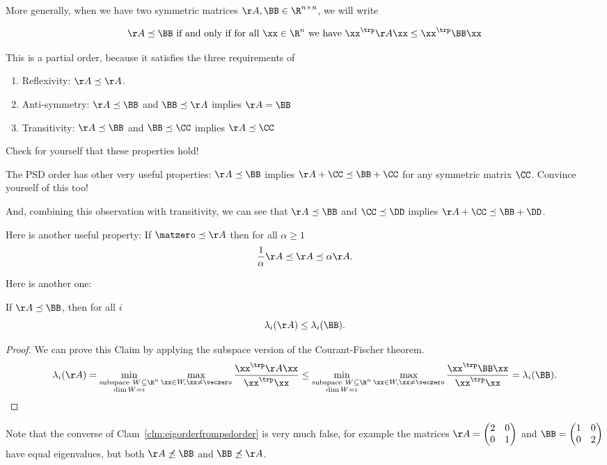 More generally, when we have two symmetric matrices $\AA, \BB \in
\R^{n \times n}$, we will write

\begin{equation}
  \label{eq:psdorder}
  \AA \preceq \BB
  \text{ if and only if for all } \xx \in \R^n
  \text{ we have } \xx^{\trp} \AA \xx \leq \xx^{\trp} \BB
  \xx
\end{equation}

This is a partial order, because it satisfies the three requirements
of
\begin{enumerate}
\item Reflexivity: $\AA \preceq \AA$.
\item Anti-symmetry:
  $\AA \preceq \BB$ and $\BB \preceq \AA$
  implies $\AA = \BB$
\item Transitivity:    $\AA \preceq \BB$ and $\BB \preceq \CC$
  implies $\AA \preceq \CC$
\end{enumerate}
Check for yourself that these properties hold!

The PSD order has other very useful properties:
$\AA \preceq \BB$ implies $\AA + \CC \preceq \BB + \CC$ for any
symmetric matrix $\CC$. Convince yourself of this too!

And, combining this observation with transitivity, we can see that
$\AA \preceq \BB$  and $\CC\preceq \DD$
implies ${\AA + \CC \preceq \BB + \DD}$.

Here is another useful property: If $\matzero \preceq \AA$ then for all $\alpha \geq 1$
\[
 \frac{1}{\alpha} \AA \preceq \AA \preceq \alpha \AA.
\]

Here is another one:
\begin{claim}
  \label{clm:eigorderfrompsdorder}
If $\AA \preceq \BB$, then for all $i$
\[
\lambda_i(\AA) \leq \lambda_i(\BB).
\]
\end{claim}
\begin{proof}
  We can prove this Claim by applying the subspace version of the
  Courant-Fischer theorem.
\[
\lambda_i(\AA) =
\min_{
      \substack{
        \mathrm{subspace~} W \subseteq \R^n
        \\
        \dim{W} = i
      }
    }
    \max_{
      \xx \in W, \xx \neq \veczero
    }
    \frac{\xx^\trp \AA\xx}{\xx^\trp\xx}
\leq
 \min_{
      \substack{
        \mathrm{subspace~} W \subseteq \R^n
        \\
        \dim{W} = i
      }
    }
    \max_{
      \xx \in W, \xx \neq \veczero
    }
    \frac{\xx^\trp \BB\xx}{\xx^\trp\xx}
= \lambda_i(\BB).
\]
\end{proof}
Note that the converse of Clam~\ref{clm:eigorderfrompsdorder} is very
much false, for example the matrices
$ \AA =
\begin{pmatrix}
  2 & 0 \\
  0 & 1
\end{pmatrix}$
and $\BB = \begin{pmatrix}
  1 & 0 \\
  0 & 2
\end{pmatrix}$ have equal eigenvalues, but both $\AA \not\preceq \BB$ and
$\BB \not\preceq \AA$.

